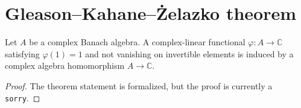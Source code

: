 \section{Gleason--Kahane--\.{Z}elazko theorem}

\begin{theorem}
\label{thm:gkz}
\notready
Let $A$ be a complex Banach algebra. A complex-linear functional $\varphi:A\to\mathbb C$ satisfying $\varphi(1)=1$ and not vanishing on invertible elements is induced by a complex algebra homomorphism $A\to\mathbb C$.
\end{theorem}

\begin{proof}
The theorem statement is formalized, but the proof is currently a \texttt{sorry}.
\end{proof}
